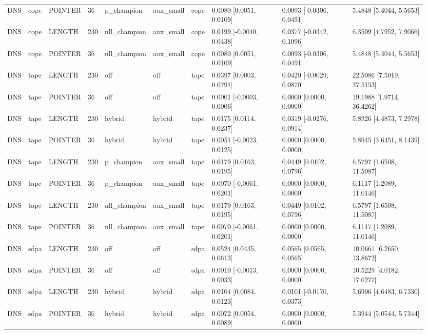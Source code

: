 \begin{tabular}{llllllllll}
DNS & cope & POINTER & 36 & p\_champion & aux\_small & cope & 0.0080 [0.0051, 0.0109] & 0.0093 [-0.0306, 0.0491] & 5.4848 [5.4044, 5.5653] \\
DNS & cope & LENGTH & 230 & nll\_champion & aux\_small & cope & 0.0199 [-0.0040, 0.0438] & 0.0377 [-0.0342, 0.1096] & 6.3509 [4.7952, 7.9066] \\
DNS & cope & POINTER & 36 & nll\_champion & aux\_small & cope & 0.0080 [0.0051, 0.0109] & 0.0093 [-0.0306, 0.0491] & 5.4848 [5.4044, 5.5653] \\
DNS & tape & LENGTH & 230 & off & off & tape & 0.0397 [0.0003, 0.0791] & 0.0420 [-0.0029, 0.0870] & 22.5086 [7.5019, 37.5153] \\
DNS & tape & POINTER & 36 & off & off & tape & 0.0001 [-0.0003, 0.0006] & 0.0000 [0.0000, 0.0000] & 19.1988 [1.9714, 36.4262] \\
DNS & tape & LENGTH & 230 & hybrid & hybrid & tape & 0.0175 [0.0114, 0.0237] & 0.0319 [-0.0276, 0.0914] & 5.8926 [4.4873, 7.2978] \\
DNS & tape & POINTER & 36 & hybrid & hybrid & tape & 0.0051 [-0.0023, 0.0125] & 0.0000 [0.0000, 0.0000] & 5.8945 [3.6451, 8.1439] \\
DNS & tape & LENGTH & 230 & p\_champion & aux\_small & tape & 0.0179 [0.0163, 0.0195] & 0.0449 [0.0102, 0.0796] & 6.5797 [1.6508, 11.5087] \\
DNS & tape & POINTER & 36 & p\_champion & aux\_small & tape & 0.0070 [-0.0061, 0.0201] & 0.0000 [0.0000, 0.0000] & 6.1117 [1.2089, 11.0146] \\
DNS & tape & LENGTH & 230 & nll\_champion & aux\_small & tape & 0.0179 [0.0163, 0.0195] & 0.0449 [0.0102, 0.0796] & 6.5797 [1.6508, 11.5087] \\
DNS & tape & POINTER & 36 & nll\_champion & aux\_small & tape & 0.0070 [-0.0061, 0.0201] & 0.0000 [0.0000, 0.0000] & 6.1117 [1.2089, 11.0146] \\
DNS & sdpa & LENGTH & 230 & off & off & sdpa & 0.0524 [0.0435, 0.0613] & 0.0565 [0.0565, 0.0565] & 10.0661 [6.2650, 13.8672] \\
DNS & sdpa & POINTER & 36 & off & off & sdpa & 0.0010 [-0.0013, 0.0033] & 0.0000 [0.0000, 0.0000] & 10.5229 [4.0182, 17.0277] \\
DNS & sdpa & LENGTH & 230 & hybrid & hybrid & sdpa & 0.0104 [0.0084, 0.0123] & 0.0101 [-0.0170, 0.0373] & 5.6906 [4.6483, 6.7330] \\
DNS & sdpa & POINTER & 36 & hybrid & hybrid & sdpa & 0.0072 [0.0054, 0.0089] & 0.0000 [0.0000, 0.0000] & 5.3944 [5.0544, 5.7344] \\

\end{tabular}
